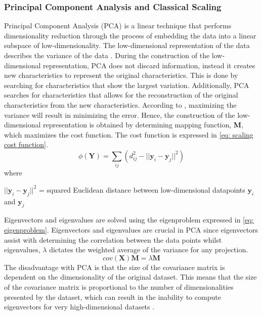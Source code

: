 \documentclass[11pt,twocolumn]{witseiepaper}
\begin{document}
	\subsubsection{Principal Component Analysis and Classical Scaling}
	Principal Component Analysis (PCA) is a linear technique that performs dimensionality reduction through the process of embedding the data into a linear subspace of low-dimensionality. The low-dimensional representation of the data describes the variance of the data \cite{Jolliffe2016}. During the construction of the low-dimensional representation, PCA does not discard information, instead it creates new characteristics to represent the original characteristics. This is done by searching for characteristics that show the largest variation. Additionally, PCA searches for characteristics that allows for the reconstruction of the original characteristics from the new characteristics. According to \cite{van2009dimensionality}, maximizing the variance will result in minimizing the error. Hence, the construction of the low-dimensional representation is obtained by determining mapping function,  \textbf{M}, which maximizes the cost function. The cost function is expressed in \eqref{eq: scaling cost function}.
	\begin{equation}
	\phi(\textbf{Y}) = \sum_{ij}(d_{ij}^{2} - ||\textbf{y}_i - \textbf{y}_j||^2)
	\label{eq: scaling cost function}
	\end{equation}
	where 
	
	$||\textbf{y}_i - \textbf{y}_j ||^{2}$ = squared Euclidean distance between low-dimensional datapoints $\textbf{y}_i$ and $\textbf{y}_j$
	
	Eigenvectors and eigenvalues are solved using the eigenproblem expressed in \eqref{eq: eigenproblem}. Eigenvectors and eigenvalues are crucial in PCA since eigenvectors assist with determining the correlation between the data points whilst eigenvalues, $\lambda$ dictates the weighted average of the variance for any projection.
	\begin{equation}
	cov(\textbf{X})\textbf{M} = \lambda\textbf{M}
	\label{eq: eigenproblem}
	\end{equation}
	The disadvantage with PCA is that the size of the covariance matrix is dependent on the dimensionality of the original dataset. This means that the size of the covariance matrix is proportional to the number of dimensionalities presented by the dataset, which can result in the inability to compute eigenvectors for very high-dimensional datasets \cite{van2009dimensionality}.
	
\end{document}
